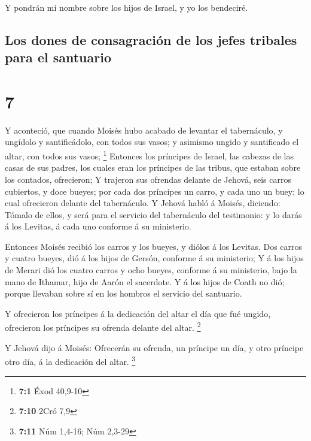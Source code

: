  Y pondrán mi nombre sobre los hijos de Israel, y yo los
bendeciré.

\hypertarget{los-dones-de-consagraciuxf3n-de-los-jefes-tribales-para-el-santuario}{%
\subsection{Los dones de consagración de los jefes tribales para el
santuario}\label{los-dones-de-consagraciuxf3n-de-los-jefes-tribales-para-el-santuario}}

\hypertarget{section-6}{%
\section{7}\label{section-6}}

 Y aconteció, que cuando Moisés hubo acabado de levantar
el tabernáculo, y ungídolo y santificádolo, con todos sus vasos; y
asimismo ungido y santificado el altar, con todos sus vasos; \footnote{\textbf{7:1}
  Éxod 40,9-10}  Entonces los príncipes de Israel, las
cabezas de las casas de sus padres, los cuales eran los príncipes de las
tribus, que estaban sobre los contados, ofrecieron;  Y
trajeron sus ofrendas delante de Jehová, seis carros cubiertos, y doce
bueyes; por cada dos príncipes un carro, y cada uno un buey; lo cual
ofrecieron delante del tabernáculo.  Y Jehová habló á
Moisés, diciendo:  Tómalo de ellos, y será para el
servicio del tabernáculo del testimonio: y lo darás á los Levitas, á
cada uno conforme á su ministerio.

 Entonces Moisés recibió los carros y los bueyes, y diólos
á los Levitas.  Dos carros y cuatro bueyes, dió á los
hijos de Gersón, conforme á su ministerio;  Y á los hijos
de Merari dió los cuatro carros y ocho bueyes, conforme á su ministerio,
bajo la mano de Ithamar, hijo de Aarón el sacerdote.  Y á
los hijos de Coath no dió; porque llevaban sobre sí en los hombros el
servicio del santuario.

 Y ofrecieron los príncipes á la dedicación del altar el
día que fué ungido, ofrecieron los príncipes su ofrenda delante del
altar. \footnote{\textbf{7:10} 2Cró 7,9}

 Y Jehová dijo á Moisés: Ofrecerán su ofrenda, un
príncipe un día, y otro príncipe otro día, á la dedicación del altar.
\footnote{\textbf{7:11} Núm 1,4-16; Núm 2,3-29}

